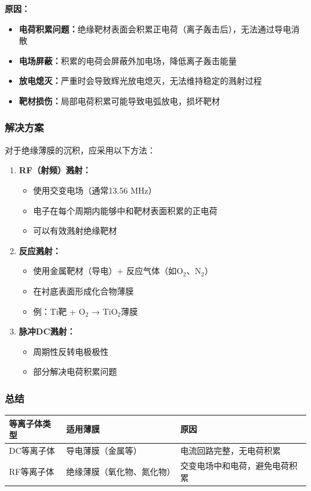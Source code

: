 \documentclass[UTF8,12pt,a4paper]{ctexart}
\begin{document}
\textbf{原因：}
\begin{itemize}
    \item \textbf{电荷积累问题：}绝缘靶材表面会积累正电荷（离子轰击后），无法通过导电消散
    \item \textbf{电场屏蔽：}积累的电荷会屏蔽外加电场，降低离子轰击能量
    \item \textbf{放电熄灭：}严重时会导致辉光放电熄灭，无法维持稳定的溅射过程
    \item \textbf{靶材损伤：}局部电荷积累可能导致电弧放电，损坏靶材
\end{itemize}

\subsubsection{解决方案}

对于绝缘薄膜的沉积，应采用以下方法：

\begin{enumerate}
    \item \textbf{RF（射频）溅射：}
    \begin{itemize}
        \item 使用交变电场（通常13.56 MHz）
        \item 电子在每个周期内能够中和靶材表面积累的正电荷
        \item 可以有效溅射绝缘靶材
    \end{itemize}
    
    \item \textbf{反应溅射：}
    \begin{itemize}
        \item 使用金属靶材（导电）+ 反应气体（如O$_2$、N$_2$）
        \item 在衬底表面形成化合物薄膜
        \item 例：Ti靶 + O$_2$ → TiO$_2$薄膜
    \end{itemize}
    
    \item \textbf{脉冲DC溅射：}
    \begin{itemize}
        \item 周期性反转电极极性
        \item 部分解决电荷积累问题
    \end{itemize}
\end{enumerate}

\subsubsection{总结}

\begin{longtable}{|L{3cm}|L{4cm}|L{7.5cm}|}
\hline
\textbf{等离子体类型} & \textbf{适用薄膜} & \textbf{原因} \\
\hline

DC等离子体 & 导电薄膜（金属等） & 电流回路完整，无电荷积累 \\
\hline

RF等离子体 & 绝缘薄膜（氧化物、氮化物） & 交变电场中和电荷，避免电荷积累 \\
\hline

\end{longtable}
\end{document}

